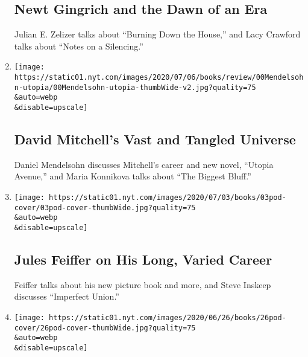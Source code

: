 \begin{enumerate}
  \hypertarget{newt-gingrich-and-the-dawn-of-an-era}{%
  \subsection{Newt Gingrich and the Dawn of an
  Era}\label{newt-gingrich-and-the-dawn-of-an-era}}

  Julian E. Zelizer talks about ``Burning Down the House,'' and Lacy
  Crawford talks about ``Notes on a Silencing.''
\item
  \href{/2020/07/10/books/review/david-mitchell-utopia-avenue-daniel-mendelsohn-biggest-bluff-poker-maria-konnikova.html}{}

  \texttt{[image: https://static01.nyt.com/images/2020/07/06/books/review/00Mendelsohn-utopia/00Mendelsohn-utopia-thumbWide-v2.jpg?quality=75\\\&auto=webp\\\&disable=upscale]}

  \hypertarget{david-mitchells-vast-and-tangled-universe}{%
  \subsection{David Mitchell's Vast and Tangled
  Universe}\label{david-mitchells-vast-and-tangled-universe}}

  Daniel Mendelsohn discusses Mitchell's career and new novel, ``Utopia
  Avenue,'' and Maria Konnikova talks about ``The Biggest Bluff.''
\item
  \href{/2020/07/03/books/review/podcast-jules-feiffer-smart-george-steve-inskeep-imperfect-union.html}{}

  \texttt{[image: https://static01.nyt.com/images/2020/07/03/books/03pod-cover/03pod-cover-thumbWide.jpg?quality=75\\\&auto=webp\\\&disable=upscale]}

  \hypertarget{jules-feiffer-on-his-long-varied-career}{%
  \subsection{Jules Feiffer on His Long, Varied
  Career}\label{jules-feiffer-on-his-long-varied-career}}

  Feiffer talks about his new picture book and more, and Steve Inskeep
  discusses ``Imperfect Union.''
\item
  \href{/2020/06/26/books/review/podcast-richard-haass-world-brief-introduction.html}{}

  \texttt{[image: https://static01.nyt.com/images/2020/06/26/books/26pod-cover/26pod-cover-thumbWide.jpg?quality=75\\\&auto=webp\\\&disable=upscale]}


\end{enumerate}
